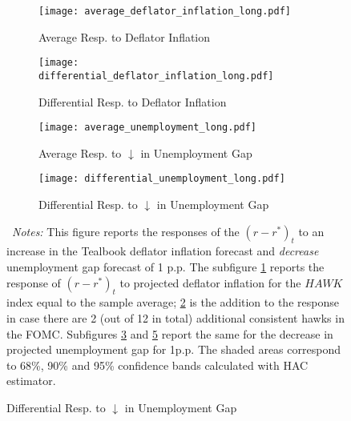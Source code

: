 \documentclass[11pt]{article}
\begin{document}
\begin{figure}[!htbp]\centering
  \begin{minipage}{.9\textwidth}
  \caption{Policy Response to Projected Deflator Inflation and Unemployment Gap and FOMC Hawkishness. Long Specification}\vspace{1ex}
  \label{fig:LP_long}
  \begin{subfigure}[b]{0.495\textwidth}
      \centering
      \caption{Average Resp. to Deflator Inflation}
      \label{fig:LP_long:average_inflation}
      \texttt{[image: average\_deflator\_inflation\_long.pdf]}
  \end{subfigure}
  \hfill
  \begin{subfigure}[b]{0.495\textwidth}
      \centering
      \caption{Differential Resp. to Deflator Inflation }
      \label{fig:LP_long:differential_inflation}
      \texttt{[image: differential\_deflator\_inflation\_long.pdf]}
  \end{subfigure}\vspace{2ex}
  \begin{subfigure}[b]{0.49\textwidth}\centering
    \caption{Average Resp. to $\downarrow$ in Unemployment Gap}
    \label{fig:LP_long:average_gap}
    \texttt{[image: average\_unemployment\_long.pdf]}
  \end{subfigure}  
  \hfill
  \begin{subfigure}[b]{0.49\textwidth}\centering
    \caption{Differential Resp. to $\downarrow$ in Unemployment Gap}
    \label{fig:LP_long:differential_gap}
    \texttt{[image: differential\_unemployment\_long.pdf]}
  \end{subfigure}
      {\begin{flushleft}\scriptsize~\textit{Notes:} This figure reports the responses of the $(r-r^*)_t$ to an increase in the Tealbook deflator inflation forecast and \emph{decrease} unemployment gap forecast of 1 p.p.
      The subfigure \ref{fig:LP_long:average_inflation} reports the response of $(r-r^*)_t$ to projected deflator inflation for the $\mathit{HAWK}$ index equal to the sample average; 
      \ref{fig:LP_long:differential_inflation} is the addition to the response in case there are 2 (out of 12 in total) additional consistent hawks in the FOMC. 
      Subfigures \ref{fig:LP_long:average_gap} and \ref{fig:LP_long:differential_gap} report the same for the decrease in projected unemployment gap for 1p.p. 
      The shaded areas correspond to 68\%, 90\% and 95\% confidence bands calculated with \citet{Andrews1991} HAC estimator.\end{flushleft}}
\end{minipage}
\end{figure}
\end{document}
